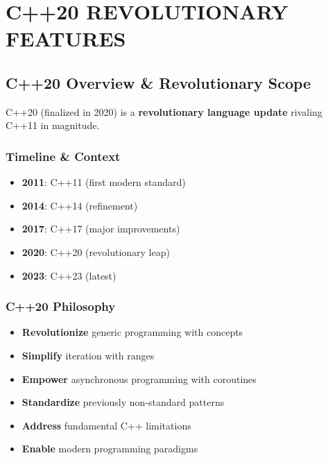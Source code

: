 \hypertarget{c20-revolutionary-features}{%
\chapter{C++20 REVOLUTIONARY
FEATURES}\label{c20-revolutionary-features}}

\hypertarget{c20-overview-revolutionary-scope}{%
\section{C++20 Overview \& Revolutionary
Scope}\label{c20-overview-revolutionary-scope}}

C++20 (finalized in 2020) is a \textbf{revolutionary language update}
rivaling C++11 in magnitude.

\hypertarget{timeline-context}{%
\subsection{Timeline \& Context}\label{timeline-context}}

\begin{itemize}
\tightlist
\item
  \textbf{2011}: C++11 (first modern standard)
\item
  \textbf{2014}: C++14 (refinement)
\item
  \textbf{2017}: C++17 (major improvements)
\item
  \textbf{2020}: C++20 (revolutionary leap)
\item
  \textbf{2023}: C++23 (latest)
\end{itemize}

\hypertarget{c20-philosophy}{%
\subsection{C++20 Philosophy}\label{c20-philosophy}}

\begin{itemize}
\tightlist
\item
  \textbf{Revolutionize} generic programming with concepts
\item
  \textbf{Simplify} iteration with ranges
\item
  \textbf{Empower} asynchronous programming with coroutines
\item
  \textbf{Standardize} previously non-standard patterns
\item
  \textbf{Address} fundamental C++ limitations
\item
  \textbf{Enable} modern programming paradigms
\end{itemize}

